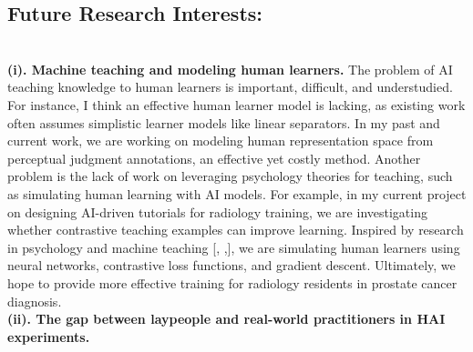 \subsection*{Future Research Interests:}



\noindent \textbf{\\(i). Machine teaching and modeling human learners.} 
The problem of AI teaching knowledge to human learners is important, difficult, and understudied. For instance, I think an effective human learner model is lacking, as existing work often assumes simplistic learner models like linear separators. In my past and current work, we are working on modeling human representation space from perceptual judgment annotations, an effective yet costly method. Another problem is the lack of work on leveraging psychology theories for teaching, such as simulating human learning with AI models. For example, in my current project on designing AI-driven tutorials for radiology training, we are investigating whether contrastive teaching examples can improve learning. Inspired by research in psychology and machine teaching [, ,], we are simulating human learners using neural networks, contrastive loss functions, and gradient descent. Ultimately, we hope to provide more effective training for radiology residents in prostate cancer diagnosis.
\noindent \textbf{\\(ii). The gap between laypeople and real-world practitioners in HAI experiments.}

